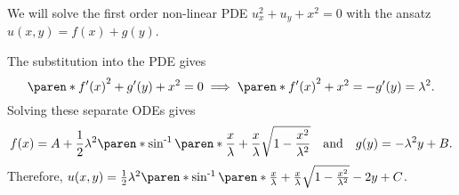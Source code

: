 \documentclass[11pt]{penrose}
\begin{document}
\begin{negg}
    We will solve the first order non-linear PDE $u_x^2 + u_y + x^2 = 0$ with the ansatz $u(x,y) = f(x) + g(y)$.

    The substitution into the PDE gives
    \begin{equation}
        \paren*{f'(x)}^2 + g'(y) + x^2 = 0
        \implies
        \paren*{f'(x)}^2 + x^2 = - g'(y) = \lambda^2.
    \end{equation}
    Solving these separate ODEs gives
    \begin{equation}
        f(x) = A + \frac{1}{2} \lambda^2 \paren*{ \asin\paren*{\frac{x}{\lambda}} + \frac{x}{\lambda}\sqrt{1 - \frac{x^2}{\lambda^2}} }
        \quad\text{and}\quad
        g(y) = -\lambda^2 y + B.
    \end{equation}
    Therefore, $u(x,y) = \frac{1}{2} \lambda^2 \paren*{ \asin\paren*{\frac{x}{\lambda}} + \frac{x}{\lambda}\sqrt{1 - \frac{x^2}{\lambda^2}} -2y }  + C$.
\end{negg}
\end{document}
